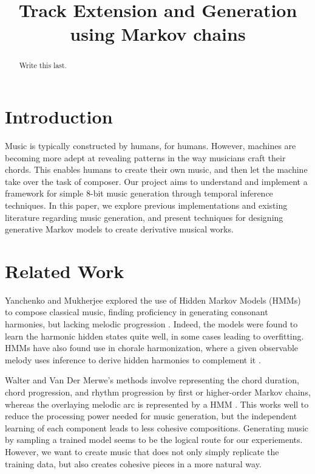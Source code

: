 \documentclass{article}
\title{Track Extension and Generation using Markov chains}
\begin{document}
\maketitle

\begin{abstract}
Write this last.
\end{abstract}

\section{Introduction}
Music is typically constructed by humans, for humans. However, machines are becoming more adept at revealing patterns in the way musicians craft their chords. 
This enables humans to create their own music, and then let the machine take over the task of composer. Our project aims to understand and implement a framework 
for simple 8-bit music generation through temporal inference techniques. In this paper, we explore previous implementations and existing literature regarding music 
generation, and present techniques for designing generative Markov models to create derivative musical works.

\section{Related Work}
Yanchenko and Mukherjee explored the use of Hidden Markov Models (HMMs) to compose classical music, finding proficiency in generating consonant harmonies, but 
lacking melodic progression \cite{yanchenko_2017}. Indeed, the models were found to learn the harmonic hidden states quite well, in some cases leading to overfitting. 
HMMs have also found use in chorale harmonization, where a given observable melody uses inference to derive hidden harmonies to complement it \cite{allan_2005}. 

Walter and Van Der Merwe's methods involve representing the chord duration, chord progression, and rhythm progression by first or higher-order Markov chains, whereas 
the overlaying melodic arc is represented by a HMM \cite{walter_2011}. This works well to reduce the processing power needed for music generation, but the independent 
learning of each component leads to less cohesive compositions. Generating music by sampling a trained model seems to be the logical route for our experiements. 
However, we want to create music that does not only simply replicate the training data, but also creates cohesive pieces in a more natural way. 
\end{document}
